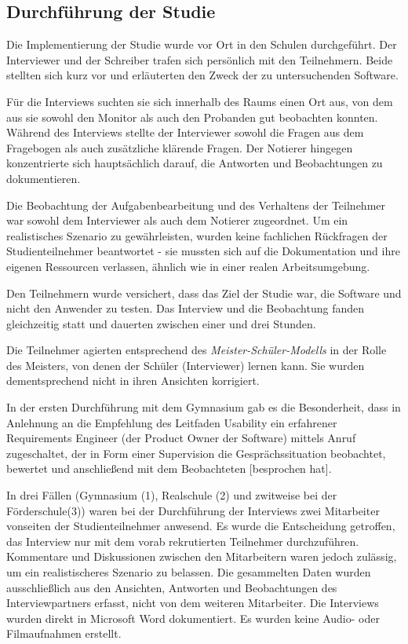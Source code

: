 \subsection{Durchführung der Studie}

Die Implementierung der Studie wurde vor Ort in den Schulen durchgeführt. Der Interviewer und der Schreiber trafen sich persönlich mit den Teilnehmern. Beide stellten sich kurz vor und erläuterten den Zweck der zu untersuchenden Software.

Für die Interviews suchten sie sich innerhalb des Raums einen Ort aus, von dem aus sie sowohl den Monitor als auch den Probanden gut beobachten konnten. Während des Interviews stellte der Interviewer sowohl die Fragen aus dem Fragebogen als auch zusätzliche klärende Fragen. Der Notierer hingegen konzentrierte sich hauptsächlich darauf, die Antworten und Beobachtungen zu dokumentieren.

Die Beobachtung der Aufgabenbearbeitung und des Verhaltens der Teilnehmer war sowohl dem Interviewer als auch dem Notierer zugeordnet. Um ein realistisches Szenario zu gewährleisten, wurden keine fachlichen Rückfragen der Studienteilnehmer beantwortet - sie mussten sich auf die Dokumentation und ihre eigenen Ressourcen verlassen, ähnlich wie in einer realen Arbeitsumgebung.

Den Teilnehmern wurde versichert, dass das Ziel der Studie war, die Software und nicht den Anwender zu testen. Das Interview und die Beobachtung fanden gleichzeitig statt und dauerten zwischen einer und drei Stunden.

Die Teilnehmer agierten entsprechend des \textit{Meister-Schüler-Modells} in der Rolle des Meisters, von denen der Schüler (Interviewer) lernen kann. Sie wurden dementsprechend nicht in ihren Ansichten korrigiert. %

In der ersten Durchführung mit dem Gymnasium gab es die Besonderheit, dass  in Anlehnung an die Empfehlung des Leitfaden Usability ein erfahrener Requirements Engineer (der Product Owner der Software) mittels Anruf zugeschaltet, der \glqq in Form einer Supervision die Gesprächssituation beobachtet, bewertet und anschließend mit dem Beobachteten [besprochen hat]\grqq{}\cite{dakks}.

In drei Fällen (Gymnasium (1), Realschule (2) und zwitweise bei der Förderschule(3)) waren bei der Durchführung der Interviews zwei Mitarbeiter vonseiten der Studienteilnehmer anwesend. Es wurde die Entscheidung getroffen, das Interview nur mit dem vorab rekrutierten Teilnehmer durchzuführen. Kommentare und Diskussionen zwischen den Mitarbeitern waren jedoch zulässig, um ein realistischeres Szenario zu belassen. Die gesammelten Daten wurden ausschließlich aus den Ansichten, Antworten und Beobachtungen des Interviewpartners erfasst, nicht von dem weiteren Mitarbeiter. Die Interviews wurden direkt in Microsoft Word dokumentiert. Es wurden keine Audio- oder Filmaufnahmen erstellt.

